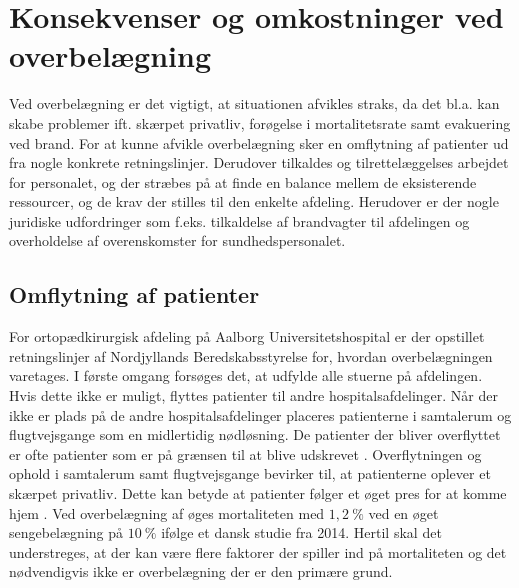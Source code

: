 \section{Konsekvenser og omkostninger ved overbelægning}
Ved overbelægning er det vigtigt, at situationen afvikles straks, da det bl.a. kan skabe problemer ift. skærpet privatliv, forøgelse i mortalitetsrate samt evakuering ved brand. \cite{Madsen2014} For at kunne afvikle overbelægning sker en omflytning af patienter ud fra nogle konkrete retningslinjer. \cite{Beredskab2016} Derudover tilkaldes og tilrettelæggelses arbejdet for personalet, og der stræbes på at finde en balance mellem de eksisterende ressourcer, og de krav der stilles til den enkelte afdeling. \cite{Bjerg2016} Herudover er der nogle juridiske udfordringer som f.eks. tilkaldelse af brandvagter til afdelingen og overholdelse af overenskomster for sundhedspersonalet. \cite{Beredskab2016}


\subsection{Omflytning af patienter}
For ortopædkirurgisk afdeling på Aalborg Universitetshospital er der opstillet retningslinjer af Nordjyllands Beredskabsstyrelse for, hvordan overbelægningen varetages. I første omgang forsøges det, at udfylde alle stuerne på afdelingen. Hvis dette ikke er muligt, flyttes patienter til andre hospitalsafdelinger. Når der ikke er plads på de andre hospitalsafdelinger placeres patienterne i samtalerum og flugtvejsgange som en midlertidig nødløsning. \cite{Beredskab2016} De patienter der bliver overflyttet er ofte patienter som er på grænsen til at blive udskrevet .
Overflytningen og ophold i samtalerum samt flugtvejsgange bevirker til, at patienterne oplever et skærpet privatliv. \cite{Madsen2014} Dette kan betyde at patienter følger et øget pres for at komme hjem . Ved overbelægning af øges mortaliteten med $1,2~\%$ ved en øget sengebelægning på $10~\%$ ifølge et dansk studie fra 2014. \cite{Madsen2014} Hertil skal det understreges, at der kan være flere faktorer der spiller ind på mortaliteten og det nødvendigvis ikke er overbelægning der er den primære grund. 



